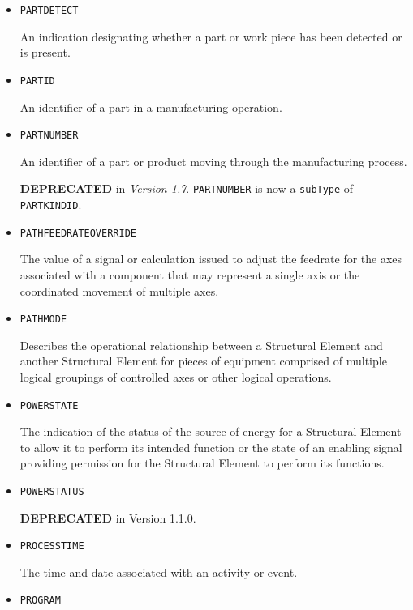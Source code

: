 \begin{itemize}
\item \texttt{PART\textunderscore DETECT}  

An indication designating whether a part or work piece has been detected or is present.


\item \texttt{PART\textunderscore ID}  

An identifier of a part in a manufacturing operation.


\item \texttt{PART\textunderscore NUMBER}  

An identifier of a part or product moving through the manufacturing process.

\textbf{DEPRECATED} in \textit{Version 1.7}. \texttt{PART\textunderscore NUMBER} is now a \texttt{subType} of
\texttt{PART\textunderscore KIND\textunderscore ID}.


\item \texttt{PATH\textunderscore FEEDRATE\textunderscore OVERRIDE}  

The value of a signal or calculation issued to adjust the feedrate for the axes associated with a  component that may represent a single axis or the coordinated movement of multiple axes.


\item \texttt{PATH\textunderscore MODE}  

Describes the operational relationship between a  \gls{Structural Element} and another  \gls{Structural Element} for pieces of equipment comprised of multiple logical groupings of controlled axes or other logical operations.


\item \texttt{POWER\textunderscore STATE}  

The indication of the status of the source of energy for a \gls{Structural Element} to allow it to perform its intended function or the state of an enabling signal providing permission for the \gls{Structural Element} to perform its functions.


\item \texttt{POWER\textunderscore STATUS}  

\textbf{DEPRECATED} in Version 1.1.0.


\item \texttt{PROCESS\textunderscore TIME}  

The time and date associated with an activity or event.


\item \texttt{PROGRAM}  


\end{itemize}
